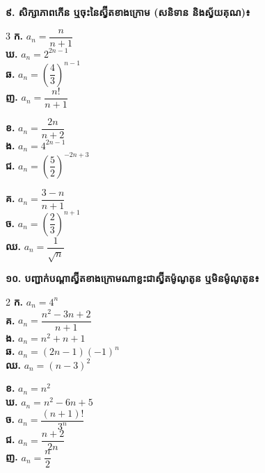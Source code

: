 \documentclass[11pt,a4paper]{article}
\begin{document}
\newpage

\textbf{៩. សិក្សាភាពកើន ឬចុះនៃស្វ៊ីតខាងក្រោម (សនិទាន និងស្វ័យគុណ)៖}
\begin{multicols}{3}
\textbf{ក.} $a_n = \dfrac{n}{n+1}$\\[8pt]
\textbf{ឃ.} $a_n = 2^{2n-1}$\\[8pt]
\textbf{ឆ.} $a_n = \left(\dfrac{4}{3}\right)^{n-1}$\\[8pt]
\textbf{ញ.} $a_n = \dfrac{n!}{n+1}$

\columnbreak
\textbf{ខ.} $a_n = \dfrac{2n}{n+2}$\\[8pt]
\textbf{ង.} $a_n = 4^{2n-1}$\\[8pt]
\textbf{ជ.} $a_n = \left(\dfrac{5}{2}\right)^{-2n+3}$

\columnbreak
\textbf{គ.} $a_n = \dfrac{3-n}{n+1}$\\[8pt]
\textbf{ច.} $a_n = \left(\dfrac{2}{3}\right)^{n+1}$\\[8pt]
\textbf{ឈ.} $a_n = \dfrac{1}{\sqrt{n}}$
\end{multicols}

\vspace{3pt}
\textbf{១០. បញ្ជាក់បណ្ដាស្វ៊ីតខាងក្រោមណាខ្លះជាស្វ៊ីតម៉ូណូតូន ឬមិនម៉ូណូតូន៖}
\begin{multicols}{2}
\textbf{ក.} $a_n = 4^n$\\[7pt]
\textbf{គ.} $a_n = \dfrac{n^2-3n+2}{n+1}$\\[7pt]
\textbf{ង.} $a_n = n^2 + n + 1$\\[7pt]
\textbf{ឆ.} $a_n = (2n-1)(-1)^n$\\[7pt]
\textbf{ឈ.} $a_n = (n-3)^2$

\columnbreak
\textbf{ខ.} $a_n = n^2$\\[7pt]
\textbf{ឃ.} $a_n = n^2 - 6n + 5$\\[7pt]
\textbf{ច.} $a_n = \dfrac{(n+1)!}{3^n}$\\[7pt]
\textbf{ជ.} $a_n = \dfrac{n+2}{2n}$\\[7pt]
\textbf{ញ.} $a_n = \dfrac{n}{2}$
\end{multicols}
\end{document}

